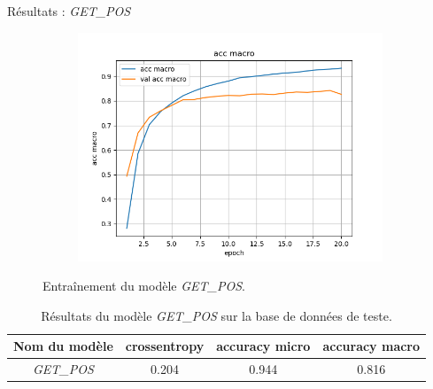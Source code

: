 \documentclass[11pt]{beamer}
\begin{document}
\begin{frame}{Résultats : \textit{GET\_POS}}
\begin{figure}
\begin{subfigure}{0.32\textwidth}
            \centering
            \includegraphics[width=\linewidth]{../logs/get_pos/acc macro.png}
        \end{subfigure}
        \caption{Entraînement du modèle \textit{GET\_POS}.}
    \end{figure}

    \begin{table}
        \centering
        \begin{tabular}{|c|c|c|c|}
            \hline
            Nom du modèle & crossentropy & accuracy micro & accuracy macro \\
            \hline
            \textit{GET\_POS} & 0.204 & 0.944 & 0.816\\
            \hline
        \end{tabular}
        \caption{Résultats du modèle \textit{GET\_POS} sur la base de données de teste.}
        \label{tab:test getpos}
    \end{table}
\end{frame}
\end{document}
